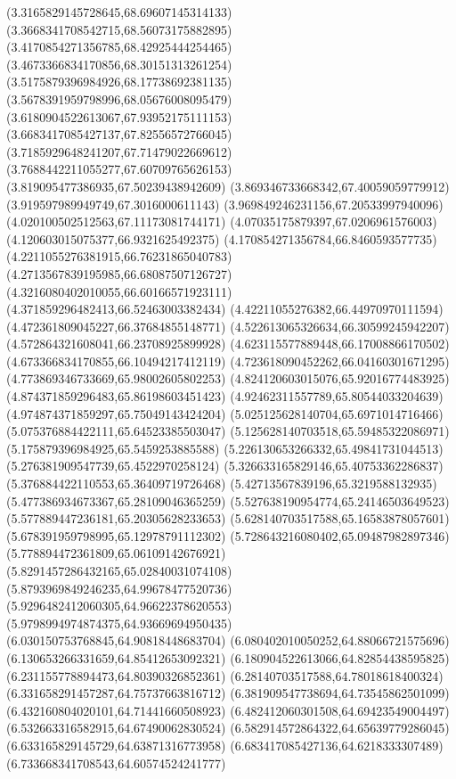 {(3.3165829145728645,68.69607145314133)
(3.3668341708542715,68.56073175882895)
(3.4170854271356785,68.42925444254465)
(3.4673366834170856,68.30151313261254)
(3.5175879396984926,68.17738692381135)
(3.5678391959798996,68.05676008095479)
(3.6180904522613067,67.93952175111153)
(3.6683417085427137,67.82556572766045)
(3.7185929648241207,67.71479022669612)
(3.7688442211055277,67.60709765626153)
(3.819095477386935,67.50239438942609)
(3.869346733668342,67.40059059779912)
(3.919597989949749,67.3016000611143)
(3.969849246231156,67.20533997940096)
(4.020100502512563,67.11173081744171)
(4.07035175879397,67.0206961576003)
(4.120603015075377,66.9321625492375)
(4.170854271356784,66.8460593577735)
(4.2211055276381915,66.76231865040783)
(4.2713567839195985,66.68087507126727)
(4.3216080402010055,66.60166571923111)
(4.371859296482413,66.52463003382434)
(4.42211055276382,66.44970970111594)
(4.472361809045227,66.37684855148771)
(4.522613065326634,66.30599245942207)
(4.572864321608041,66.23708925899928)
(4.623115577889448,66.17008866170502)
(4.673366834170855,66.10494217412119)
(4.723618090452262,66.04160301671295)
(4.773869346733669,65.98002605802253)
(4.824120603015076,65.92016774483925)
(4.874371859296483,65.86198603451423)
(4.92462311557789,65.80544033204639)
(4.974874371859297,65.75049143424204)
(5.025125628140704,65.6971014716466)
(5.075376884422111,65.64523385503047)
(5.125628140703518,65.59485322086971)
(5.175879396984925,65.5459253885588)
(5.226130653266332,65.49841731044513)
(5.276381909547739,65.4522970258124)
(5.326633165829146,65.40753362286837)
(5.376884422110553,65.36409719726468)
(5.42713567839196,65.3219588132935)
(5.477386934673367,65.28109046365259)
(5.527638190954774,65.24146503649523)
(5.577889447236181,65.20305628233653)
(5.628140703517588,65.16583878057601)
(5.678391959798995,65.12978791112302)
(5.728643216080402,65.09487982897346)
(5.778894472361809,65.06109142676921)
(5.8291457286432165,65.02840031074108)
(5.8793969849246235,64.99678477520736)
(5.9296482412060305,64.96622378620553)
(5.9798994974874375,64.93669694950435)
(6.030150753768845,64.90818448683704)
(6.080402010050252,64.88066721575696)
(6.130653266331659,64.85412653092321)
(6.180904522613066,64.82854438595825)
(6.231155778894473,64.80390326852361)
(6.28140703517588,64.78018618400324)
(6.331658291457287,64.75737663816712)
(6.381909547738694,64.73545862501099)
(6.432160804020101,64.71441660508923)
(6.482412060301508,64.69423549004497)
(6.532663316582915,64.67490062830524)
(6.582914572864322,64.65639779286045)
(6.633165829145729,64.63871316773958)
(6.683417085427136,64.6218333307489)
(6.733668341708543,64.60574524241777)
}

